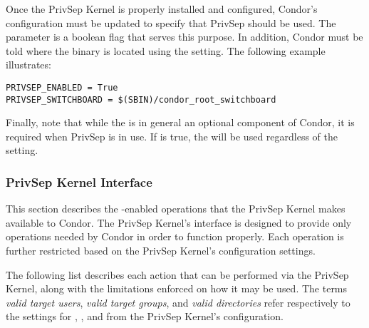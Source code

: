 Once the PrivSep Kernel is properly installed and configured, Condor's
configuration must be updated to specify that PrivSep should be
used. The  parameter is a boolean flag that
serves this purpose. In addition, Condor must be told where the
 binary is located using the
 setting. The following example
illustrates:
\begin{verbatim}
PRIVSEP_ENABLED = True
PRIVSEP_SWITCHBOARD = $(SBIN)/condor_root_switchboard
\end{verbatim}

Finally, note that while the  is in general an optional
component of Condor, it is required when PrivSep is in use. If
 is true, the  will be used
regardless of the  setting.

\subsubsection{PrivSep Kernel Interface}

This section describes the -enabled operations that the
PrivSep Kernel makes available to Condor. The PrivSep Kernel's
interface is designed to provide only operations needed by Condor in
order to function properly. Each operation is further restricted based
on the PrivSep Kernel's configuration settings.

The following list describes each action that can be performed via the
PrivSep Kernel, along with the limitations enforced on how it may be
used. The terms \emph{valid target users}, \emph{valid target groups},
and \emph{valid directories} refer respectively to the settings for
, , and
 from the PrivSep Kernel's configuration.

